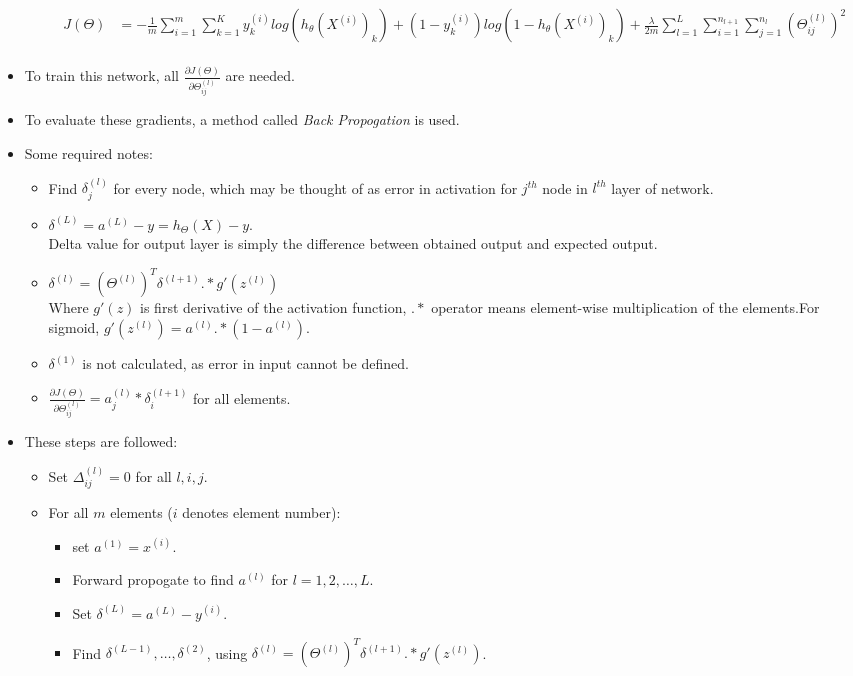 \documentclass{article}
\begin{document}
\begin{itemize}
\begin{itemize}
		\begin{align*}
			J(\Theta) &= -\frac{1}{m} \sum_{i=1}^m \sum_{k=1}^K y^{(i)}_klog(h_\theta(X^{(i)})_k) + (1-y^{(i)}_k)log(1-h_\theta(X^{(i)})_k) + \frac{\lambda}{2m}\sum_{l=1}^L \sum_{i=1}^{n_{l+1}} \sum_{j=1}^{n_l} (\Theta^{(l)}_{ij})^2\\
		\end{align*}
	\end{itemize}
	\item To train this network, all $\frac{\partial J(\Theta)}{\partial \Theta^{(l)}_{ij}}$ are needed.
	\item To evaluate these gradients, a method called \emph{Back Propogation} is used.
	\item Some required notes:
	\begin{itemize}
		\item Find $\delta^{(l)}_j$ for every node, which may be thought of as error in activation for $j^{th}$ node in $l^{th}$ layer of network.
		\item $\delta^{(L)} = a^{(L)}- y = h_\Theta(X)-y$.\\Delta value for output layer is simply the difference between obtained output and expected output.
		\item $\delta^{(l)} = (\Theta^{(l)})^T \delta^{(l+1)}.*g'(z^{(l)})$\\Where $g'(z)$ is first derivative of the activation function, $.*$ operator means element-wise multiplication of the elements.For sigmoid, $g'(z^{(l)}) = a^{(l)}.*(1-a^{(l)})$.
		\item $\delta^{(1)}$ is not calculated, as error in input cannot be defined.
		\item $\frac{\partial J(\Theta)}{\partial \Theta^{(l)}_{ij}} = a_j^{(l)}*\delta_i^{(l+1)}$ for all elements.
	\end{itemize}
	\item These steps are followed:\begin{itemize}
		\item Set $\Delta^{(l)}_{ij}=0$ for all $l,i,j$.
		\item For all $m$ elements ($i$ denotes element number): \begin{itemize}
			\item set $a^{(1)}=x^{(i)}$.
			\item Forward propogate to find $a^{(l)}$ for $l=1,2,\dots,L$.
			\item Set $\delta^{(L)} = a^{(L)}- y^{(i)}$.
			\item Find $\delta^{(L-1)},\dots,\delta^{(2)}$, using $\delta^{(l)} = (\Theta^{(l)})^T \delta^{(l+1)}.*g'(z^{(l)})$.

\end{itemize}
\end{itemize}
\end{itemize}
\end{document}
